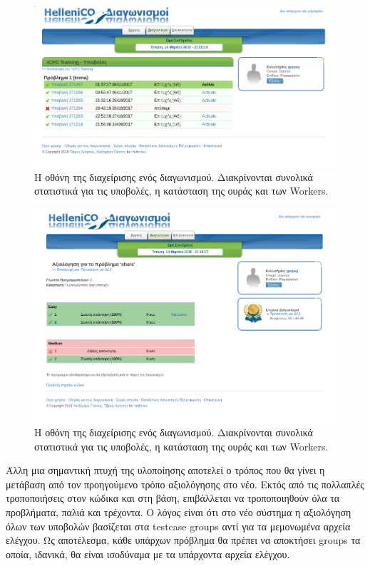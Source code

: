 \documentclass[diploma]{softlab-thesis}
\begin{document}
\begin{figure}
  \centering
  \includegraphics[scale=0.3,trim=4 4 4 4,clip]{Figures/allsubmissions.png}
  \caption[Οθόνη διαχείρισης προβλήματος]{Η οθόνη της διαχείρισης ενός διαγωνισμού.
  Διακρίνονται συνολικά στατιστικά για τις υποβολές, η κατάσταση της ουράς και των
  Workers.}
\end{figure}

\begin{figure}
  \centering
  \includegraphics[scale=0.3,trim=4 4 4 4,clip]{Figures/cursubmission.png}
  \caption[Οθόνη διαχείρισης προβλήματος]{Η οθόνη της διαχείρισης ενός διαγωνισμού.
  Διακρίνονται συνολικά στατιστικά για τις υποβολές, η κατάσταση της ουράς και των
  Workers.}
\end{figure}

\bigskip

Άλλη μια σημαντική πτυχή της υλοποίησης αποτελεί ο τρόπος που θα γίνει η
μετάβαση από τον προηγούμενο τρόπο αξιολόγησης στο νέο. Εκτός από τις πολλαπλές
τροποποιήσεις στον κώδικα και στη βάση, επιβάλλεται να τροποποιηθούν όλα τα
προβλήματα, παλιά και τρέχοντα. Ο λόγος είναι ότι στο νέο σύστημα η αξιολόγηση όλων
των υποβολών βασίζεται στα testcase groups αντί για τα μεμονωμένα αρχεία ελέγχου.
Ως αποτέλεσμα, κάθε υπάρχων πρόβλημα θα πρέπει να αποκτήσει groups τα οποία,
ιδανικά, θα είναι ισοδύναμα με τα υπάρχοντα αρχεία ελέγχου.
\end{document}
